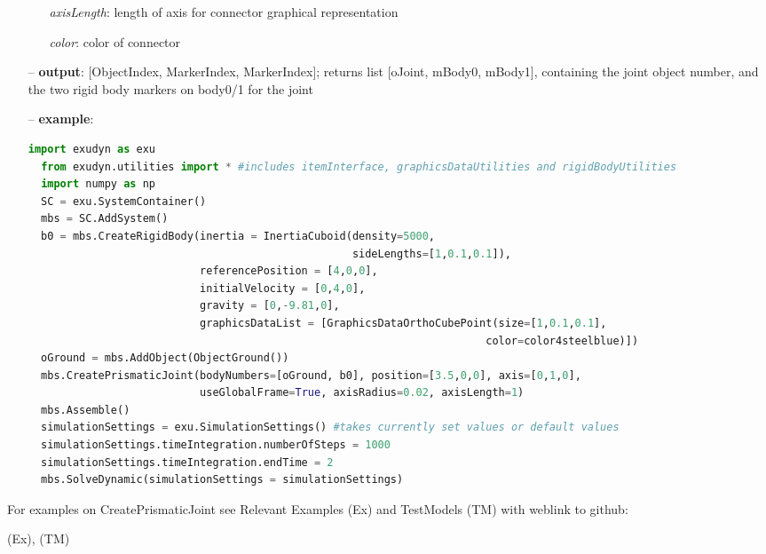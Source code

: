 \begin{itemize}[leftmargin=0.7cm]
\begin{itemize}[leftmargin=1.2cm]
\item[]{\it axisLength}: length of axis for connector graphical representation
\item[]{\it color}: color of connector
\end{itemize}
\item[--]
{\bf output}: [ObjectIndex, MarkerIndex, MarkerIndex]; returns list [oJoint, mBody0, mBody1], containing the joint object number, and the two rigid body markers on body0/1 for the joint
\item[--]
{\bf example}: \vspace{-12pt}\ei\begin{lstlisting}[language=Python, xleftmargin=36pt]
  import exudyn as exu
  from exudyn.utilities import * #includes itemInterface, graphicsDataUtilities and rigidBodyUtilities
  import numpy as np
  SC = exu.SystemContainer()
  mbs = SC.AddSystem()
  b0 = mbs.CreateRigidBody(inertia = InertiaCuboid(density=5000,
                                                   sideLengths=[1,0.1,0.1]),
                           referencePosition = [4,0,0],
                           initialVelocity = [0,4,0],
                           gravity = [0,-9.81,0],
                           graphicsDataList = [GraphicsDataOrthoCubePoint(size=[1,0.1,0.1],
                                                                        color=color4steelblue)])
  oGround = mbs.AddObject(ObjectGround())
  mbs.CreatePrismaticJoint(bodyNumbers=[oGround, b0], position=[3.5,0,0], axis=[0,1,0],
                           useGlobalFrame=True, axisRadius=0.02, axisLength=1)
  mbs.Assemble()
  simulationSettings = exu.SimulationSettings() #takes currently set values or default values
  simulationSettings.timeIntegration.numberOfSteps = 1000
  simulationSettings.timeIntegration.endTime = 2
  mbs.SolveDynamic(simulationSettings = simulationSettings)
\end{lstlisting}\vspace{-24pt}\bi\item[]\vspace{-24pt}\vspace{12pt}\end{itemize}
%

%
\noindent For examples on CreatePrismaticJoint see Relevant Examples (Ex) and TestModels (TM) with weblink to github:
\bi
 \item \footnotesize {} (Ex), 
 (TM)
\ei

